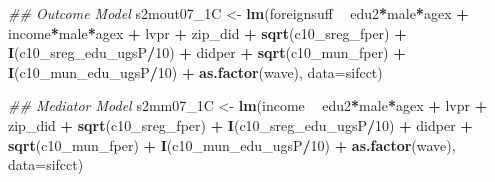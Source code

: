 \documentclass[
]{article}
\newenvironment{Shaded}{\begin{snugshade}}{\end{snugshade}}
\newcommand{\CommentTok}[1]{\textcolor[rgb]{0.56,0.35,0.01}{\textit{#1}}}
\newcommand{\DataTypeTok}[1]{\textcolor[rgb]{0.13,0.29,0.53}{#1}}
\newcommand{\DecValTok}[1]{\textcolor[rgb]{0.00,0.00,0.81}{#1}}
\newcommand{\KeywordTok}[1]{\textcolor[rgb]{0.13,0.29,0.53}{\textbf{#1}}}
\newcommand{\NormalTok}[1]{#1}
\newcommand{\OperatorTok}[1]{\textcolor[rgb]{0.81,0.36,0.00}{\textbf{#1}}}
\newcommand{\StringTok}[1]{\textcolor[rgb]{0.31,0.60,0.02}{#1}}
\begin{document}
\begin{Shaded}
\begin{Highlighting}[]
\CommentTok{## Outcome Model }
\NormalTok{s2mout07_1C <-}\StringTok{ }\KeywordTok{lm}\NormalTok{(foreignsuff  }\OperatorTok{~}\StringTok{ }\NormalTok{edu2}\OperatorTok{*}\NormalTok{male}\OperatorTok{*}\NormalTok{agex }\OperatorTok{+}\StringTok{ }\NormalTok{income}\OperatorTok{*}\NormalTok{male}\OperatorTok{*}\NormalTok{agex }\OperatorTok{+}\StringTok{ }\NormalTok{lvpr }\OperatorTok{+}\StringTok{  }
\StringTok{                    }\NormalTok{zip_did }\OperatorTok{+}\StringTok{ }\KeywordTok{sqrt}\NormalTok{(c10_sreg_fper) }\OperatorTok{+}\StringTok{ }\KeywordTok{I}\NormalTok{(c10_sreg_edu_ugsP}\OperatorTok{/}\DecValTok{10}\NormalTok{) }\OperatorTok{+}\StringTok{ }
\StringTok{                    }\NormalTok{didper }\OperatorTok{+}\StringTok{ }\KeywordTok{sqrt}\NormalTok{(c10_mun_fper) }\OperatorTok{+}\StringTok{ }\KeywordTok{I}\NormalTok{(c10_mun_edu_ugsP}\OperatorTok{/}\DecValTok{10}\NormalTok{) }\OperatorTok{+}\StringTok{ }
\StringTok{                    }\KeywordTok{as.factor}\NormalTok{(wave), }\DataTypeTok{data=}\NormalTok{sifcct)}

\CommentTok{## Mediator Model}
\NormalTok{s2mm07_1C <-}\StringTok{ }\KeywordTok{lm}\NormalTok{(income  }\OperatorTok{~}\StringTok{ }\NormalTok{edu2}\OperatorTok{*}\NormalTok{male}\OperatorTok{*}\NormalTok{agex }\OperatorTok{+}\StringTok{ }\NormalTok{lvpr }\OperatorTok{+}\StringTok{  }
\StringTok{                  }\NormalTok{zip_did }\OperatorTok{+}\StringTok{ }\KeywordTok{sqrt}\NormalTok{(c10_sreg_fper) }\OperatorTok{+}\StringTok{ }\KeywordTok{I}\NormalTok{(c10_sreg_edu_ugsP}\OperatorTok{/}\DecValTok{10}\NormalTok{) }\OperatorTok{+}\StringTok{ }
\StringTok{                  }\NormalTok{didper }\OperatorTok{+}\StringTok{ }\KeywordTok{sqrt}\NormalTok{(c10_mun_fper) }\OperatorTok{+}\StringTok{ }\KeywordTok{I}\NormalTok{(c10_mun_edu_ugsP}\OperatorTok{/}\DecValTok{10}\NormalTok{) }\OperatorTok{+}\StringTok{ }
\StringTok{                  }\KeywordTok{as.factor}\NormalTok{(wave), }\DataTypeTok{data=}\NormalTok{sifcct)}


\end{Highlighting}
\end{Shaded}
\end{document}
